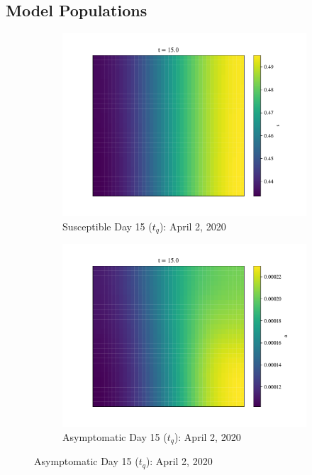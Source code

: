 \documentclass[11pt]{article}
\begin{document}
	\newpage
	\subsection*{Model Populations}
		\begin{figure}[H]
			\centering
			\begin{subfigure}{0.5\textwidth}
				\includegraphics[width=\textwidth]{susceptible_15}
				\caption{Susceptible Day 15 ($t_q$): April 2, 2020}
			\end{subfigure}%
			\begin{subfigure}{0.5\textwidth}
				\includegraphics[width=\textwidth]{asymptomatic_15}
				\caption{Asymptomatic Day 15 ($t_q$): April 2, 2020}
			\end{subfigure}
			

\end{figure}
\end{document}
